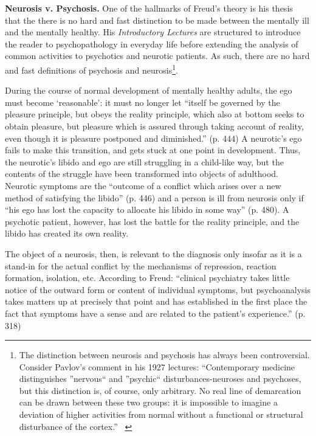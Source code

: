 \begin{refsection}
\begin{apatextbox}
\end{apatextbox}

\textbf{Neurosis v. Psychosis.} One of the hallmarks of Freud's theory is his thesis that the there is no hard and fast distinction to be made between the mentally ill and the mentally healthy. His \emph{Introductory Lectures} are structured to introduce the reader to psychopathology in everyday life before extending the analysis of common activities to psychotics and neurotic patients. As such, there are no hard and fast definitions of psychosis and neurosis\footnote{The distinction between neurosis and psychosis has always been controversial. Consider Pavlov's comment in his 1927 lectures: ``Contemporary medicine distinguishes ''nervous`` and ''psychic`` disturbances-neuroses and psychoses, but this distinction is, of course, only arbitrary. No real line of demarcation can be drawn between these two groups: it is impossible to imagine a deviation of higher activities from normal without a functional or structural disturbance of the cortex.'' ~\citep[Lecture 23]{Pavlov:1946ws}}.

During the course of normal development of mentally healthy adults, the ego must become `reasonable': it must no longer let ``itself be governed by the pleasure principle, but obeys the reality principle, which also at bottom seeks to obtain pleasure, but pleasure which is assured through taking account of reality, even though it is pleasure postponed and diminished.'' (p. 444) A neurotic's ego fails to make this transition, and gets stuck at one point in development. Thus, the neurotic's libido and ego are still struggling in a child-like way, but the contents of the struggle have been transformed into objects of adulthood. Neurotic symptoms are the ``outcome of a conflict which arises over a new method of satisfying the libido'' (p. 446) and a person is ill from neurosis only if ``his ego has lost the capacity to allocate his libido in some way'' (p. 480). A psychotic patient, however, has lost the battle for the reality principle, and the libido has created its own reality.

The object of a neurosis, then, is relevant to the diagnosis only insofar as it is a stand-in for the actual conflict by the mechanisms of repression, reaction formation, isolation, etc. According to Freud: ``clinical psychiatry takes little notice of the outward form or content of individual symptoms, but psychoanalysis takes matters up at precisely that point and has established in the first place the fact that symptoms have a sense and are related to the patient's experience.'' (p. 318)


\end{refsection}
